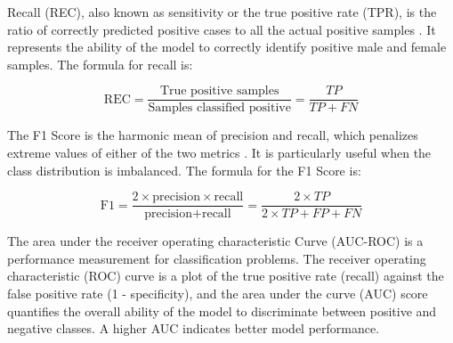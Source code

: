 Recall (REC), also known as sensitivity or the true positive rate (TPR), is the ratio of correctly predicted positive cases to all the actual positive samples \cite{cui2020}. It represents the ability of the model to correctly identify positive male and female samples. The formula for recall is:

\begin{equation}
	\text{REC} = \frac{\text{True positive samples}}{\text{Samples classified positive}} = \frac{TP}{TP + FN}
	\label{eq:rec}
\end{equation}

The F1 Score is the harmonic mean of precision and recall, which penalizes extreme values of either of the two metrics \cite{cui2020}. It is particularly useful when the class distribution is imbalanced. The formula for the F1 Score is:

\begin{equation}
	\text{F1} = \frac{2 \times \text{precision} \times \text{recall}}{\text{precision} + \text{recall}} = \frac{2 \times TP}{2 \times TP + FP + FN}
	\label{eq:f1}
\end{equation}

The area under the receiver operating characteristic Curve (AUC-ROC) is a performance measurement for classification problems. The receiver operating characteristic (ROC) curve is a plot of the true positive rate (recall) against the false positive rate (1 - specificity), and the area under the curve (AUC) score quantifies the overall ability of the model to discriminate between positive and negative classes. A higher AUC indicates better model performance. \cite{nahm2022} 